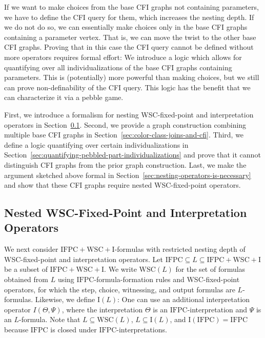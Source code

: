 \documentclass[]{lmcs}
\newcommand{\formB}{\Psi}
\newcommand{\interpret}{\Theta}
\newcommand{\IFPC}{\ensuremath{\mathrm{IFPC}}}
\newcommand{\IFPCWSCI}{\ensuremath{\mathrm{IFPC{+}WSC{+}I}}}
\newcommand{\WSCof}[1]{\mathrm{WSC}(#1)}
\newcommand{\Iof}[1]{\mathrm{I}(#1)}
\begin{document}
If we want to make choices from the base CFI graphs not containing parameters,
we have to define the CFI query for them, which increases the nesting depth.
If we do not do so, we can essentially make choices only in the base CFI graphs containing a parameter vertex.
That is, we can move the twist to the other base CFI graphs.
Proving that in this case the CFI query cannot be defined without more operators requires formal effort:
We introduce a logic which allows for quantifying over all individualizations of the base CFI graphs containing parameters.
This is (potentially) more powerful than making choices, but we still can prove non-definability of the CFI query.
This logic has the benefit that we can characterize it via a pebble game.

First, we introduce a formalism for nesting WSC-fixed-point and interpretation operators in Section~\ref{sec:nested-operators}.
Second, we provide a graph construction combining multiple base CFI graphs in Section~\ref{sec:color-class-joins-and-cfi}.
Third, we define a logic quantifying over certain individualizations in Section~\ref{sec:quantifying-pebbled-part-individualizations}
and prove that it cannot distinguish CFI graphs from the prior graph construction.
Last, we make the argument sketched above formal in Section~\ref{sec:nesting-operators-is-necessary} and show that
these CFI graphs require nested WSC-fixed-point operators.


\newcommand{\wscrank}[1]{\operatorname*{wscr}(#1)}
\subsection{Nested WSC-Fixed-Point and Interpretation Operators}
\label{sec:nested-operators}
We next consider \IFPCWSCI{}\nobreakdash-formulas with restricted nesting depth of
WSC-fixed-point and interpretation operators.
Let $\IFPC{} \subseteq L \subseteq \IFPCWSCI{}$ be a subset of \IFPCWSCI{}.
We write $\WSCof{L}$ for the set of formulas
obtained from $L$ using \IFPC{}-formula-formation rules
and WSC-fixed-point operators,
for which the step, choice, witnessing, and output formulas are $L$-formulas.
Likewise, we define $\Iof{L}$:
One can use an additional interpretation operator $I(\interpret, \formB)$,
where  the interpretation $\interpret$ is an $\IFPC{}$-interpretation and $\formB$ is an $L$-formula.
Note that $L \subseteq \WSCof{L}$, $L \subseteq \Iof{L}$,
and $\Iof{\IFPC} = \IFPC{}$ because \IFPC{} is closed under \IFPC{}-interpretations.
\end{document}
